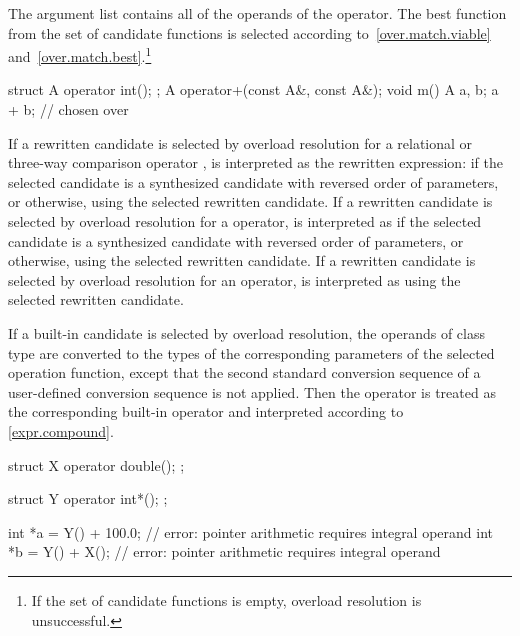 \pnum
The argument list contains all of the
operands of the operator.
The best function from the set of candidate functions is selected
according to~\ref{over.match.viable}
and~\ref{over.match.best}.\footnote{If the set of candidate functions is empty,
overload resolution is unsuccessful.}
\begin{example}

\begin{codeblock}
struct A {
  operator int();
};
A operator+(const A&, const A&);
void m() {
  A a, b;
  a + b;                        //  chosen over 
}
\end{codeblock}
\end{example}

\pnum
If a rewritten candidate is selected by overload resolution
for a relational or three-way comparison operator ,
is interpreted as the rewritten expression:
if the selected candidate is a synthesized candidate
with reversed order of parameters,
or  otherwise,
using the selected rewritten  candidate.
If a rewritten candidate is selected by overload resolution
for a \tcode{!=} operator,
 is interpreted as 
if the selected candidate is a synthesized candidate
with reversed order of parameters, or
 otherwise,
using the selected rewritten  candidate.
If a rewritten candidate is selected by overload resolution
for an \tcode{==} operator,
 is interpreted as 
using the selected rewritten  candidate.

\pnum
If a built-in candidate is selected by overload resolution, the
operands of class type are converted to the types of the corresponding parameters
of the selected operation function, except that the second standard conversion
sequence of a user-defined conversion sequence is not applied.
Then the operator is treated as the corresponding
built-in operator and interpreted according to \ref{expr.compound}.
\begin{example}
\begin{codeblock}
struct X {
  operator double();
};

struct Y {
  operator int*();
};

int *a = Y() + 100.0;           // error: pointer arithmetic requires integral operand
int *b = Y() + X();             // error: pointer arithmetic requires integral operand
\end{codeblock}
\end{example}

